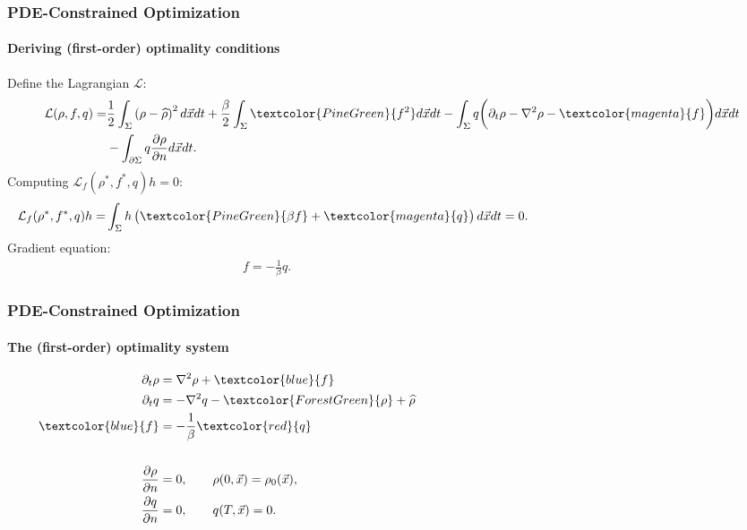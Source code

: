 \documentclass[aspectratio=169,xcolor=dvipsnames]{beamer}
\begin{document}
\begin{frame}
	\frametitle{PDE-Constrained Optimization}
	\framesubtitle{Deriving (first-order) optimality conditions}
	\vspace{0.2 cm}
	Define the Lagrangian $\mathcal{L}$:
	\begin{align*}
		\mathcal{L}(\rho, f,q)=& \frac{1}{2}\int_\Sigma \left(\rho- \widehat{\rho}\right)^2 d \vec x dt + \frac{\beta}{2} \int_\Sigma \textcolor{PineGreen}{f^2} d \vec x dt - \int_\Sigma q \bigg( \partial_t \rho - \nabla^2 \rho  - \textcolor{magenta}{f} \bigg) d\vec{x} dt \\
		&- \int_{\partial \Sigma} q \frac{\partial \rho}{\partial n}   d\vec{x} dt.
	\end{align*}
	Computing  $\mathcal{L}_f (\rho^*, f^*,q)h = 0$:
	\begin{align*}
		\mathcal{L}_f (\rho^*, f^*,q)h = & \int_\Sigma h \left(\textcolor{PineGreen}{\beta f} + \textcolor{magenta}{q} \right) d\vec{x} dt = 0.\qquad\qquad\qquad\qquad\qquad\qquad\qquad\qquad\qquad
	\end{align*}
	Gradient equation:
	\begin{align*}
		f = -\frac{1}{\beta}q. \qquad\qquad\qquad\qquad\qquad\qquad\qquad\qquad\qquad\qquad
	\end{align*}
\end{frame}
\begin{frame}
	\frametitle{PDE-Constrained Optimization}
	\framesubtitle{The (first-order) optimality system}
	
	\begin{align*}
		\partial_t \rho &= \nabla^2 \rho + \textcolor{blue}{f}  \\
		\partial_t q &=  -  \nabla^2 q - \textcolor{ForestGreen}{\rho} + \widehat \rho 
		\phantom{ngodshornvnien fjpisj wfseij gvjepi vwe  bfkdienwpiemf feq}\\
		\textcolor{blue}{f} &= - \frac{1}{\beta}\textcolor{red}{q}\\
		\\
		\frac{\partial \rho}{\partial n} &= 0, \qquad \rho(0,\vec{x})=\rho_0(\vec{x}),\\
		\frac{\partial q}{\partial n} &= 0, \qquad q(T,\vec{x})= 0.
	\end{align*}
\end{frame}
\end{document}
